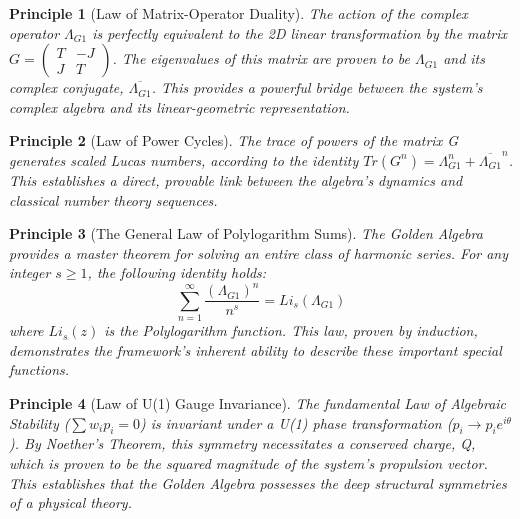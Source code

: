 \documentclass{article}
\theoremstyle{plain}
\newtheorem{principle}{Principle}[section]
\theoremstyle{definition}
\theoremstyle{remark}
\begin{document}
\begin{principle}[Law of Matrix-Operator Duality]
The action of the complex operator $\Lambda_{G1}$ is perfectly equivalent to the 2D linear transformation by the matrix $G = \begin{pmatrix} T & -J \\ J & T \end{pmatrix}$. The eigenvalues of this matrix are proven to be $\Lambda_{G1}$ and its complex conjugate, $\overline{\Lambda_{G1}}$. This provides a powerful bridge between the system's complex algebra and its linear-geometric representation.
\end{principle}

\begin{principle}[Law of Power Cycles]
The trace of powers of the matrix G generates scaled Lucas numbers, according to the identity $Tr(G^n) = \Lambda_{G1}^n + \overline{\Lambda_{G1}}^n$. This establishes a direct, provable link between the algebra's dynamics and classical number theory sequences.
\end{principle}

\begin{principle}[The General Law of Polylogarithm Sums]
The Golden Algebra provides a master theorem for solving an entire class of harmonic series. For any integer $s \ge 1$, the following identity holds:
$$ \sum_{n=1}^{\infty} \frac{(\Lambda_{G1})^n}{n^s} = Li_s(\Lambda_{G1}) $$
where $Li_s(z)$ is the Polylogarithm function. This law, proven by induction, demonstrates the framework's inherent ability to describe these important special functions.
\end{principle}

\begin{principle}[Law of U(1) Gauge Invariance]
The fundamental Law of Algebraic Stability ($\sum w_i p_i = 0$) is invariant under a U(1) phase transformation ($p_i \rightarrow p_i e^{i\theta}$). By Noether's Theorem, this symmetry necessitates a conserved charge, Q, which is proven to be the squared magnitude of the system's propulsion vector. This establishes that the Golden Algebra possesses the deep structural symmetries of a physical theory.
\end{principle}
\end{document}
